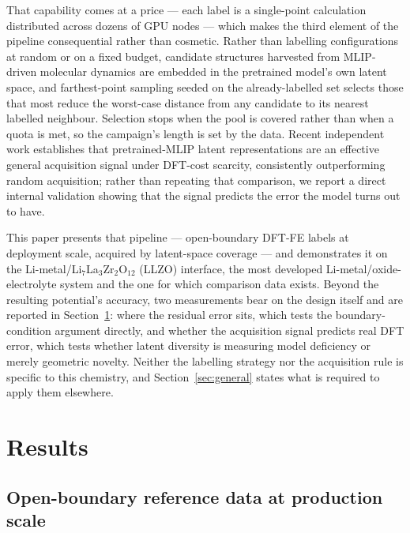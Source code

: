 \documentclass[11pt]{article}
\begin{document}
That capability comes at a price --- each label is a single-point calculation
distributed across dozens of GPU nodes --- which makes the third element of the
pipeline consequential rather than cosmetic. Rather than labelling
configurations at random or on a fixed budget, candidate structures harvested
from MLIP-driven molecular dynamics are embedded in the pretrained model's own
latent space, and farthest-point sampling seeded on the already-labelled set
selects those that most reduce the worst-case distance from any candidate to
its nearest labelled neighbour. Selection stops when the pool is covered rather
than when a quota is met, so the campaign's length is set by the data. Recent
independent work establishes that pretrained-MLIP latent representations are an
effective general acquisition signal under DFT-cost scarcity, consistently
outperforming random acquisition\citep{vargaumbrich2026}; rather than repeating
that comparison, we report a direct internal validation showing that the signal
predicts the error the model turns out to have.

This paper presents that pipeline --- open-boundary DFT-FE labels at deployment
scale, acquired by latent-space coverage --- and demonstrates it on the
Li-metal/Li$_7$La$_3$Zr$_2$O$_{12}$ (LLZO) interface, the most developed
Li-metal/oxide-electrolyte system and the one for which comparison data exists.
Beyond the resulting potential's accuracy, two measurements bear on the design
itself and are reported in Section~\ref{sec:results}: where the residual error
sits, which tests the boundary-condition argument directly, and whether the
acquisition signal predicts real DFT error, which tests whether latent
diversity is measuring model deficiency or merely geometric novelty. Neither
the labelling strategy nor the acquisition rule is specific to this chemistry,
and Section~\ref{sec:general} states what is required to apply them elsewhere.

\section{Results}
\label{sec:results}

\subsection{Open-boundary reference data at production scale}
\end{document}
